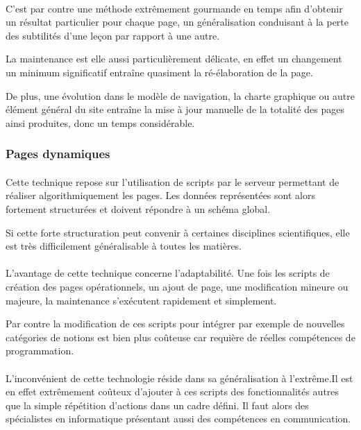 \paragraph{}C'est par contre une méthode extrêmement gourmande en temps afin d'obtenir un résultat particulier pour chaque page, un généralisation conduisant à la perte des subtilités d'une leçon par rapport à une autre. 

La maintenance est elle aussi particulièrement délicate, en effet un changement un minimum significatif entraîne quasiment la ré-élaboration de la page. 

De plus, une évolution dans le modèle de navigation, la charte graphique ou autre élément général du site entraîne la mise à jour manuelle de la totalité des pages ainsi produites, donc un temps considérable.   

\subsubsection{Pages dynamiques}
\paragraph{}Cette technique repose sur l'utilisation de scripts par le serveur permettant de réaliser algorithmiquement les pages. Les données représentées sont alors fortement structurées et doivent répondre à un schéma global. 

Si cette forte structuration peut convenir à certaines disciplines scientifiques, elle est très difficilement généralisable à toutes les matières.

\paragraph{}L'avantage de cette technique concerne l'adaptabilité. Une fois les scripts de création des pages opérationnels, un ajout de page, une modification mineure ou majeure, la maintenance s'exécutent rapidement et simplement. 

Par contre la modification de ces scripts pour intégrer par exemple de nouvelles catégories de notions est bien plus coûteuse car requière de réelles compétences de programmation.

\paragraph{}L'inconvénient de cette technologie réside dans sa généralisation à l'extrême.Il est en effet extrêmement coûteux d'ajouter à ces scripts des fonctionnalités autres que la simple répétition d'actions dans un cadre défini. Il faut alors des spécialistes en informatique présentant aussi des compétences en communication. 

